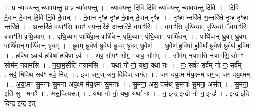 \documentclass[17pt]{extarticle}
\begin{document}
1. प्र च्या॑वयन्तु च्यावयन्तु॒ प्र प्र च्या॑वयन्तु । . च्या॒व॒य॒न्तु॒ दि॒वि दि॒वि च्या॑वयन्तु च्यावयन्तु दि॒वि । . दि॒वि दे॒वान् दे॒वान् दि॒वि दि॒वि दे॒वान् । . दे॒वान् दृꣳ॑ह दृꣳह दे॒वान् दे॒वान् दृꣳ॑ह । . दृꣳ॒॒हा॒ न्तरि॑क्षे अ॒न्तरि॑क्षे दृꣳह दृꣳहा॒ न्तरि॑क्षे । . अ॒न्तरि॑क्षे॒ वयाꣳ॑सि॒ वयाꣳ॑ स्य॒न्तरि॑क्षे अ॒न्तरि॑क्षे॒ वयाꣳ॑सि । . वयाꣳ॑सि पृथि॒व्याम् पृ॑थि॒व्यां ॅवयाꣳ॑सि॒ वयाꣳ॑सि पृथि॒व्याम् । . पृ॒थि॒व्याम् पार्थि॑वा॒न् पार्थि॑वान् पृथि॒व्याम् पृ॑थि॒व्याम् पार्थि॑वान् । . पार्थि॑वान् ध्रु॒वम् ध्रु॒वम् पार्थि॑वा॒न् पार्थि॑वान् ध्रु॒वम् । . ध्रु॒वम् ध्रु॒वेण॑ ध्रु॒वेण॑ ध्रु॒वम् ध्रु॒वम् ध्रु॒वेण॑ । . ध्रु॒वेण॑ ह॒विषा॑ ह॒विषा᳚ ध्रु॒वेण॑ ध्रु॒वेण॑ ह॒विषा᳚ । . ह॒विषा ऽवाव॑ ह॒विषा॑ ह॒विषा ऽव॑ । . अव॒ सोमꣳ॒॒ सोम॒ मवाव॒ सोम᳚म् । . सोम॑म् नयामसि नयामसि॒ सोमꣳ॒॒ सोम॑म् नयामसि । . न॒या॒म॒सीति॑ नयामसि । . यथा॑ नो नो॒ यथा॒ यथा॑ नः । . नः॒ सर्वꣳ॒॒ सर्व॑म् नो नः॒ सर्व᳚म् । . सर्व॒ मिदिथ् सर्वꣳ॒॒ सर्व॒ मित् । . इज् जग॒ज् जग॒ दिदिज् जग॑त् । . जग॑ दय॒क्ष्म म॑य॒क्ष्मम् जग॒ज् जग॑ दय॒क्ष्मम् । . अ॒य॒क्ष्मꣳ सु॒मनाः᳚ सु॒मना॑ अय॒क्ष्म म॑य॒क्ष्मꣳ सु॒मनाः᳚ । . सु॒मना॒ अस॒ दस॑थ् सु॒मनाः᳚ सु॒मना॒ अस॑त् । . सु॒मना॒ इति॑ सु - मनाः᳚ । . अस॒दित्यस॑त् । . यथा॑ नो नो॒ यथा॒ यथा॑ नः । . न॒ इन्द्र॒ इन्द्रो॑ नो न॒ इन्द्रः॑ । . इन्द्र॒ इदि दिन्द्र॒ इन्द्र॒ इत् । \newline
\end{document}
